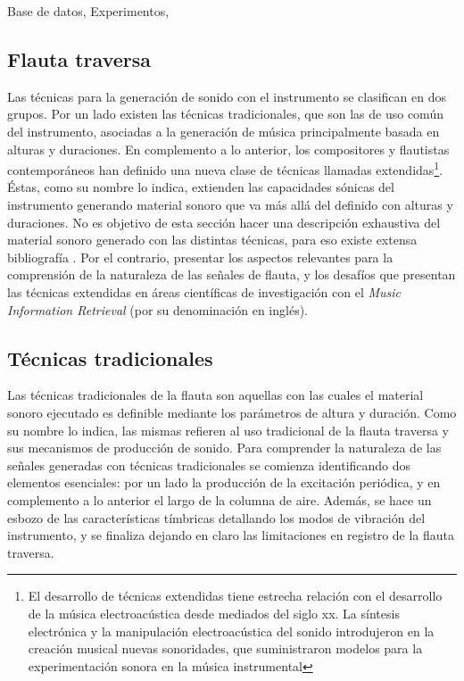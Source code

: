 \documentclass
  [ams,pdfout]%
	{aeslac}
\begin{document}
Base de datos,
Experimentos,


%
\subsection{Flauta traversa}

Las técnicas para la generación de sonido con el instrumento se clasifican en dos grupos. Por un lado existen las técnicas tradicionales, que son las de uso común del instrumento, asociadas a la generación de música principalmente basada en alturas y duraciones. En complemento a lo anterior, los compositores y flautistas contemporáneos han definido una nueva clase de técnicas llamadas extendidas\footnote{El desarrollo de técnicas extendidas tiene estrecha relación con el desarrollo de la música electroacústica desde mediados del siglo xx. La síntesis electrónica y la manipulación electroacústica del sonido introdujeron en la creación musical nuevas sonoridades, que suministraron modelos para la experimentación sonora en la música instrumental}. Éstas, como su nombre lo indica, extienden las capacidades sónicas del instrumento generando material sonoro que va más allá del definido con alturas y duraciones. No es objetivo de esta sección hacer una descripción exhaustiva del material sonoro generado con las distintas técnicas, para eso existe extensa bibliografía \cite{piston1955orchestration,samuel2002study,dick1975other}. Por el contrario, presentar los aspectos relevantes para la comprensión de la naturaleza de las señales de flauta, y los desafíos que presentan las técnicas extendidas en áreas científicas de investigación con el \textit{Music Information Retrieval} (por su denominación en inglés).   


\subsection{Técnicas tradicionales}

Las técnicas tradicionales de la flauta son aquellas con las cuales el material sonoro ejecutado es definible mediante los parámetros de altura y duración. Como su nombre lo indica, las mismas refieren al uso tradicional de la flauta traversa y sus mecanismos de producción de sonido. Para comprender la naturaleza de las señales generadas con técnicas tradicionales se comienza identificando dos elementos esenciales: por un lado la producción de la excitación periódica, y en complemento a lo anterior el largo de la columna de aire. Además, se hace un esbozo de las características tímbricas detallando los modos de vibración del instrumento, y se finaliza dejando en claro las limitaciones en registro de la flauta traversa. 
\end{document}
